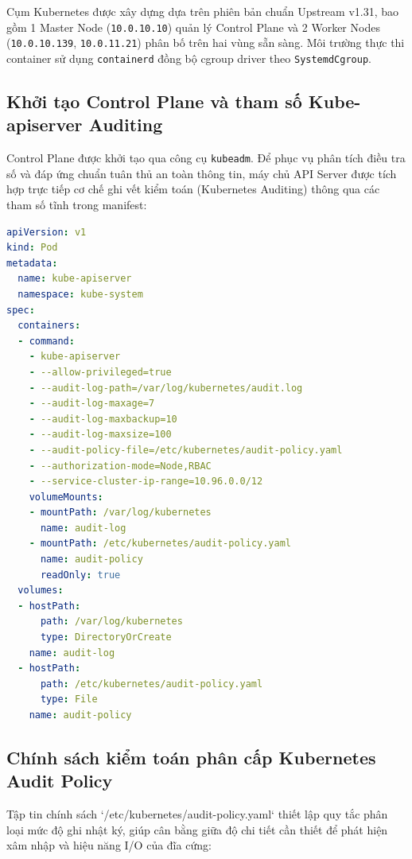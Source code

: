 Cụm Kubernetes được xây dựng dựa trên phiên bản chuẩn Upstream v1.31, bao gồm 1 Master Node (\texttt{10.0.10.10}) quản lý Control Plane và 2 Worker Nodes (\texttt{10.0.10.139}, \texttt{10.0.11.21}) phân bố trên hai vùng sẵn sàng. Môi trường thực thi container sử dụng \texttt{containerd} đồng bộ cgroup driver theo \texttt{SystemdCgroup}.

\subsection{Khởi tạo Control Plane và tham số Kube-apiserver Auditing}
Control Plane được khởi tạo qua công cụ \texttt{kubeadm}. Để phục vụ phân tích điều tra số và đáp ứng chuẩn tuân thủ an toàn thông tin, máy chủ API Server được tích hợp trực tiếp cơ chế ghi vết kiểm toán (Kubernetes Auditing) thông qua các tham số tĩnh trong manifest:

\begin{lstlisting}[language=yaml, caption={Trích đoạn cấu hình Kube-apiserver tích hợp Auditing (/etc/kubernetes/manifests/kube-apiserver.yaml)}]
apiVersion: v1
kind: Pod
metadata:
  name: kube-apiserver
  namespace: kube-system
spec:
  containers:
  - command:
    - kube-apiserver
    - --allow-privileged=true
    - --audit-log-path=/var/log/kubernetes/audit.log
    - --audit-log-maxage=7
    - --audit-log-maxbackup=10
    - --audit-log-maxsize=100
    - --audit-policy-file=/etc/kubernetes/audit-policy.yaml
    - --authorization-mode=Node,RBAC
    - --service-cluster-ip-range=10.96.0.0/12
    volumeMounts:
    - mountPath: /var/log/kubernetes
      name: audit-log
    - mountPath: /etc/kubernetes/audit-policy.yaml
      name: audit-policy
      readOnly: true
  volumes:
  - hostPath:
      path: /var/log/kubernetes
      type: DirectoryOrCreate
    name: audit-log
  - hostPath:
      path: /etc/kubernetes/audit-policy.yaml
      type: File
    name: audit-policy
\end{lstlisting}

\subsection{Chính sách kiểm toán phân cấp Kubernetes Audit Policy}
Tập tin chính sách `/etc/kubernetes/audit-policy.yaml` thiết lập quy tắc phân loại mức độ ghi nhật ký, giúp cân bằng giữa độ chi tiết cần thiết để phát hiện xâm nhập và hiệu năng I/O của đĩa cứng:

